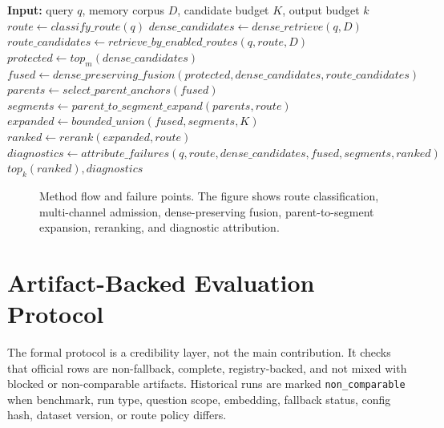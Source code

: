 \documentclass[10pt]{article}
\newcommand{\system}{DysonSpherain}
\begin{document}
\begin{algorithm}[t]
\caption{\system{} route-conditioned candidate admission}
\label{alg:dysonspherain}
\begin{algorithmic}[1]
\State \textbf{Input:} query $q$, memory corpus $D$, candidate budget $K$, output budget $k$
\State $route \gets classify\_route(q)$
\State $dense\_candidates \gets dense\_retrieve(q,D)$
\State $route\_candidates \gets retrieve\_by\_enabled\_routes(q,route,D)$
\State $protected \gets top_m(dense\_candidates)$
\State $fused \gets dense\_preserving\_fusion(protected,dense\_candidates,route\_candidates)$
\State $parents \gets select\_parent\_anchors(fused)$
\State $segments \gets parent\_to\_segment\_expand(parents,route)$
\State $expanded \gets bounded\_union(fused,segments,K)$
\State $ranked \gets rerank(expanded,route)$
\State $diagnostics \gets attribute\_failures(q,route,dense\_candidates,fused,segments,ranked)$
\State \Return $top_k(ranked), diagnostics$
\end{algorithmic}
\end{algorithm}

\begin{figure}[t]
  \centering
  
  \caption{Method flow and failure points. The figure shows route
  classification, multi-channel admission, dense-preserving fusion,
  parent-to-segment expansion, reranking, and diagnostic attribution.}
  \label{fig:pipeline}
\end{figure}

\begin{table}[t]
  \centering
  \caption{Route-policy and budget metadata extracted from formal artifact
  metric files. Missing entries indicate that the formal artifact did not store
  the parameter, not that the value was zero.}
  \label{tab:route-policy}
  
\end{table}

\section{Artifact-Backed Evaluation Protocol}

The formal protocol is a credibility layer, not the main contribution. It
checks that official rows are non-fallback, complete, registry-backed, and not
mixed with blocked or non-comparable artifacts. Historical runs are marked
\texttt{non\_comparable} when benchmark, run type, question scope, embedding,
fallback status, config hash, dataset version, or route policy differs.
\end{document}
